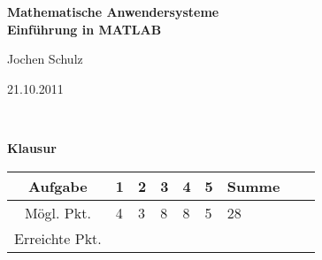 \usepackage{amssymb}
\usepackage{amsmath}
\usepackage[svgnames]{xcolor} %




\parindent0cm 




\begin{center}
\textbf{\LARGE Mathematische Anwendersysteme }\\
\textbf{\LARGE Einführung in MATLAB}\\\medskip
\end{center}
\begin{minipage}{6cm}
Jochen Schulz
\end{minipage}\hfill
\begin{minipage}{4cm}
21.10.2011
\end{minipage}\\[1cm]

\begin{center}
\Huge \textbf{Klausur}
\end{center}
\bigskip\bigskip\bigskip
\Large
\begin{center}
\begin{tabular}{|Sl||p{0.5cm}|p{0.5cm}|p{0.5cm}|p{0.5cm}|p{0.5cm}|Sc|}
\hline
Aufgabe & \textbf{1} & \textbf{2} & \textbf{3} & \textbf{4} & \textbf{5}  & \textbf{Summe}\\
\hline
Mögl. Pkt. &  4  & 3   & 8  & 8  & 5  &  28  \\
\hline
Erreichte Pkt. &    &    &   &   &   &    \\
\hline
\end{tabular}
\end{center}

